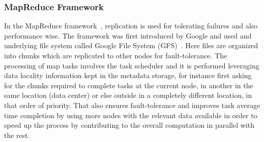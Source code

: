 \subsubsection{MapReduce Framework}
In the MapReduce framework~\cite{Dean:04}, replication is used for tolerating failures and also performance wise. The framework was first introduced by Google and used and underlying file system called Google File System (GFS)~\cite{Ghemawat:03}. Here files are organized into chunks which are replicated to other nodes for fault-tolerance. The processing of map tasks involves the task scheduler and it is performed leveraging data locality information kept in the metadata storage, for instance first asking for the chunks required to complete tasks at the current node, in another in the same location (data center) or else outside in a completely different location, in that order of priority. That also ensures fault-tolerance and improves task average time completion by using more nodes with the relevant data available in order to speed up the process by contributing to the overall computation in parallel with the rest.



